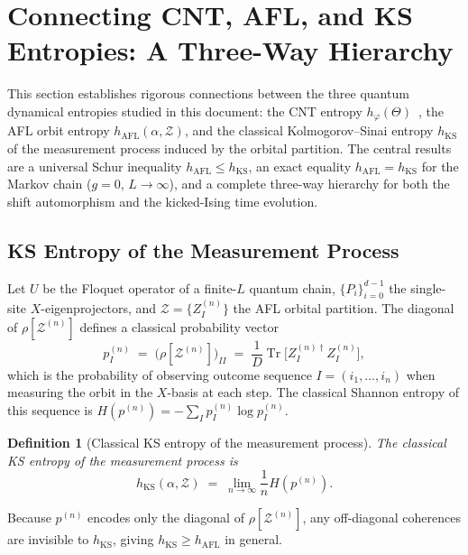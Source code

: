 \documentclass[12pt,a4paper]{article}
\newtheorem{definition}[theorem]{Definition}
\begin{document}
\section{Connecting CNT, AFL, and KS Entropies: A Three-Way Hierarchy}
\label{sec:cnt_afl_ks}

This section establishes rigorous connections between the three quantum
dynamical entropies studied in this document: the CNT entropy
$h_\varphi(\Theta)$~\cite{cnt87}, the AFL orbit entropy
$h_{\mathrm{AFL}}(\alpha,\mathcal{Z})$, and the classical Kolmogorov--Sinai
entropy $h_{\mathrm{KS}}$ of the measurement process induced by the orbital
partition.  The central results are a universal Schur inequality
$h_{\mathrm{AFL}}\leq h_{\mathrm{KS}}$, an exact equality
$h_{\mathrm{AFL}}=h_{\mathrm{KS}}$ for the Markov chain ($g=0$,
$L\to\infty$), and a complete three-way hierarchy for both the shift
automorphism and the kicked-Ising time evolution.

\subsection{KS Entropy of the Measurement Process}
\label{sec:ks_meas}

Let $U$ be the Floquet operator of a finite-$L$ quantum chain, $\{P_i\}_{i=0}^{d-1}$
the single-site $X$-eigenprojectors, and $\mathcal{Z}=\{Z_I^{(n)}\}$ the AFL
orbital partition.  The diagonal of $\rho[\mathcal{Z}^{(n)}]$ defines a classical
probability vector
\[
  p^{(n)}_I \;=\; \bigl(\rho[\mathcal{Z}^{(n)}]\bigr)_{II}
  \;=\; \frac{1}{D}\operatorname{Tr}\bigl[Z_I^{(n)\dagger}Z_I^{(n)}\bigr],
\]
which is the probability of observing outcome sequence $I=(i_1,\ldots,i_n)$ when
measuring the orbit in the $X$-basis at each step.  The classical Shannon entropy
of this sequence is $H(p^{(n)})=-\sum_I p^{(n)}_I\log p^{(n)}_I$.

\begin{definition}[Classical KS entropy of the measurement process]
\label{def:ks_meas}
The classical KS entropy of the measurement process is
\[
  h_{\mathrm{KS}}(\alpha,\mathcal{Z})
  \;=\; \lim_{n\to\infty}\frac{1}{n}H\!\left(p^{(n)}\right).
\]
\end{definition}

Because $p^{(n)}$ encodes only the diagonal of $\rho[\mathcal{Z}^{(n)}]$, any
off-diagonal coherences are invisible to $h_{\mathrm{KS}}$, giving
$h_{\mathrm{KS}}\geq h_{\mathrm{AFL}}$ in general.
\end{document}
